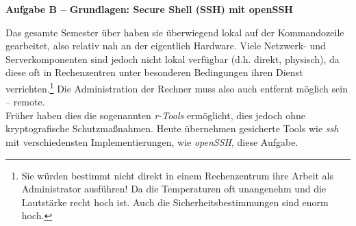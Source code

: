 \documentclass[paper=a4,fontsize=11pt]{scrartcl}%
\numberwithin{equation}{section}
\begin{document}
\begin{center}\Large{\textbf{Aufgabe B -- Grundlagen: Secure Shell (SSH) mit openSSH}}\end{center}\vskip0.25in
Das gesamte Semester über haben sie überwiegend lokal auf der Kommandozeile gearbeitet, also relativ nah an der eigentlich Hardware. Viele Netzwerk- und Serverkomponenten sind jedoch nicht lokal verfügbar (d.h. direkt, physisch), da diese oft in Rechenzentren unter besonderen Bedingungen ihren Dienst verrichten.\footnote{Sie würden bestimmt nicht direkt in einem Rechenzentrum ihre Arbeit als Administrator ausführen! Da die Temperaturen oft unangenehm und die Lautstärke recht hoch ist. Auch die Sicherheitsbestimmungen sind enorm hoch.} Die Administration der Rechner muss also auch entfernt möglich sein -- remote.\\
Früher haben dies die sogenannten \emph{r-Tools} ermöglicht, dies jedoch ohne kryptografische Schutzmaßnahmen. Heute übernehmen gesicherte Tools wie \emph{ssh} mit verschiedensten Implementierungen, wie \emph{openSSH}, diese Aufgabe.
\end{document}
